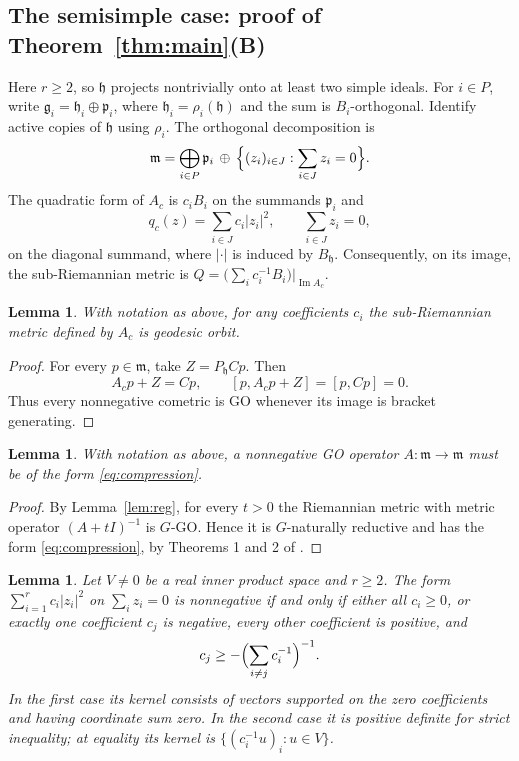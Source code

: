 \documentclass[12pt]{amsart}
\theoremstyle{plain}
\newtheorem{lemma}[theorem]{Lemma}
\theoremstyle{definition}
\theoremstyle{remark}
\newcommand{\alg}[1]{\mathfrak{#1}}
\newcommand{\imd}{\operatorname{Im}}
\begin{document}
\subsection{The semisimple case: proof of Theorem~\ref{thm:main}(B)}\label{subsec:semisimple}

Here $r\ge2$, so $\alg{h}$ projects nontrivially onto at least two simple ideals. For $i\in P$,
write $\alg{g}_i=\alg{h}_i\oplus\alg{p}_i$, where $\alg{h}_i=\rho_i(\alg{h})$ and the sum is
$B_i$-orthogonal. Identify active copies of $\alg{h}$ using $\rho_i$. The orthogonal decomposition
is
\begin{equation}\label{eq:decomp}
\alg{m}=\bigoplus_{i\in P}\alg{p}_i\,\oplus\,\Bigl\{(z_i)_{i\in J}:\sum_{i\in J}z_i=0\Bigr\}.
\end{equation}
The quadratic form of $A_c$ is $c_iB_i$ on the summands $\alg{p}_i$ and
\[ q_c(z)=\sum_{i\in J}c_i|z_i|^2,\qquad \sum_{i\in J}z_i=0, \]
on the diagonal summand, where $|\cdot|$ is induced by $B_{\alg{h}}$. Consequently, on its image,
the sub-Riemannian metric is $Q=\big(\sum_i c_i^{-1}B_i\big)\big|_{\imd A_c}$.

\begin{lemma}\label{lem:compGO}
With notation as above, for any coefficients $c_i$ the sub-Riemannian metric defined by $A_c$ is
geodesic orbit.
\end{lemma}

\begin{proof}
For every $p\in\alg{m}$, take $Z=P_{\alg{h}}Cp$. Then
\[ A_cp+Z=Cp,\qquad [p,A_cp+Z]=[p,Cp]=0. \]
Thus every nonnegative cometric is GO whenever its image is bracket generating.
\end{proof}

\begin{lemma}\label{lem:form}
With notation as above, a nonnegative GO operator $A:\alg{m}\to\alg{m}$ must be of the form
\eqref{eq:compression}.
\end{lemma}

\begin{proof}
By Lemma~\ref{lem:reg}, for every $t>0$ the Riemannian metric with metric operator
$(A+tI)^{-1}$ is $G$-GO. Hence it is $G$-naturally reductive and has the form
\eqref{eq:compression}, by Theorems 1 and 2 of \cite{ChenNN}.
\end{proof}

\begin{lemma}\label{lem:quadform}
Let $V\neq0$ be a real inner product space and $r\ge2$. The form $\sum_{i=1}^{r}c_i|z_i|^2$ on
$\sum_i z_i=0$ is nonnegative if and only if either all $c_i\ge0$, or exactly one coefficient $c_j$
is negative, every other coefficient is positive, and
\[ c_j\ge-\Bigl(\sum_{i\neq j}c_i^{-1}\Bigr)^{-1}. \]
In the first case its kernel consists of vectors supported on the zero coefficients and having
coordinate sum zero. In the second case it is positive definite for strict inequality; at equality
its kernel is $\{(c_i^{-1}u)_i:u\in V\}$.
\end{lemma}
\end{document}
